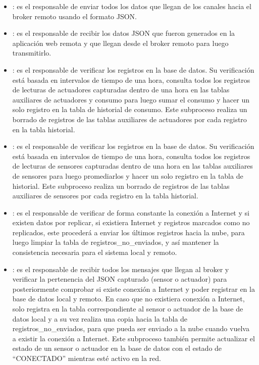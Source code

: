 \begin{itemize}
\item {}: es el responsable de enviar todos los datos que llegan de los canales hacia el broker remoto usando el formato JSON.

\item {}: es el responsable de recibir los datos JSON que fueron generados en la aplicación web remota y que llegan desde el broker remoto para luego transmitirlo.

\item {}: es el responsable de verificar los registros en la base de datos. Su verificación está basada en intervalos de tiempo de una hora, consulta todos los registros de lecturas de actuadores capturadas dentro de una hora en las tablas auxiliares de actuadores y consumo para luego sumar el consumo y hacer un solo registro en la tabla de historial de consumo. Este subproceso realiza un borrado de registros de las tablas auxiliares de actuadores por cada registro en la tabla historial.

\item {}: es el responsable de verificar los registros en la base de datos. Su verificación está basada en intervalos de tiempo de una hora, consulta todos los registros de lecturas de sensores capturadas dentro de una hora en las tablas auxiliares de sensores para luego promediarlos y hacer un solo registro en la tabla de historial. Este subproceso realiza un borrado de registros de las tablas auxiliares de sensores por cada registro en la tabla historial.

\item {}: es el responsable de verificar de forma constante la conexión a Internet y si existen datos por replicar, si existiera Internet y registros marcados como no replicados, este procederá a enviar los últimos registros hacia la nube, para luego limpiar la tabla de registros\_no\_enviados, y así mantener la consistencia necesaria para el sistema local y remoto.

\item {}: es el responsable de recibir todos los mensajes que llegan al broker y verificar la pertenencia del JSON capturado (sensor o actuador) para posteriormente comprobar si existe conexión a Internet y poder registrar en la base de datos local y remoto. En caso que no existiera conexión a Internet, solo registra en la tabla correspondiente al sensor o actuador de la base de datos local y a su vez realiza una copia hacia la tabla de registros\_no\_enviados, para que pueda ser enviado a la nube cuando vuelva a existir la conexión a Internet. Este subproceso también permite actualizar el estado de un sensor o actuador en la base de datos con el estado de ``CONECTADO'' mientras esté activo en la red.


\end{itemize}
